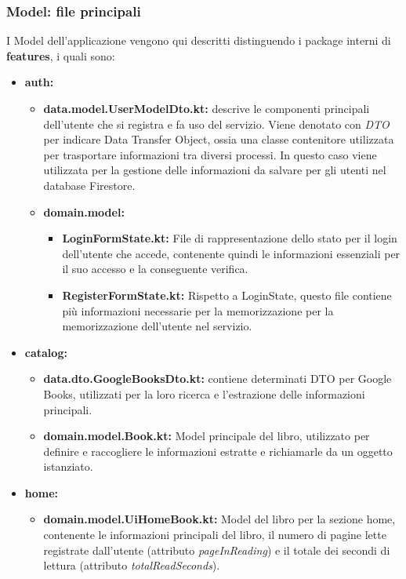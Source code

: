 \documentclass{article}
\begin{document}
\subsubsection{Model: file principali}
I Model dell'applicazione vengono qui descritti distinguendo i package interni di \textbf{features}, i quali sono:
\begin{itemize}
  \item \textbf{auth:}
  \begin{itemize}
    \item \textbf{data.model.UserModelDto.kt:} descrive le componenti principali dell'utente che si registra e fa uso del servizio.
    Viene denotato con \textit{DTO} per indicare Data Transfer Object, ossia una classe contenitore utilizzata per trasportare informazioni tra diversi processi.
    In questo caso viene utilizzata per la gestione delle informazioni da salvare per gli utenti nel database Firestore.
    \item \textbf{domain.model:}
    \begin{itemize}
      \item \textbf{LoginFormState.kt:} File di rappresentazione dello stato per il login dell'utente che accede, contenente quindi le informazioni essenziali per il suo accesso e la conseguente verifica.
      \item \textbf{RegisterFormState.kt:} Rispetto a LoginState, questo file contiene più informazioni necessarie per la memorizzazione per la memorizzazione dell'utente nel servizio.
    \end{itemize}
  \end{itemize}
  \item \textbf{catalog:}
  \begin{itemize}
    \item \textbf{data.dto.GoogleBooksDto.kt:} contiene determinati DTO per Google Books, utilizzati per la loro ricerca e l'estrazione delle informazioni principali.
    \item \textbf{domain.model.Book.kt:} Model principale del libro, utilizzato per definire e raccogliere le informazioni estratte e richiamarle da un oggetto istanziato.
  \end{itemize}
  \item \textbf{home:}
  \begin{itemize}
    \item \textbf{domain.model.UiHomeBook.kt:} Model del libro per la sezione home, contenente le informazioni principali del libro, il numero di pagine lette registrate dall'utente (attributo \textit{pageInReading}) e il totale dei secondi di lettura (attributo \textit{totalReadSeconds}).

\end{itemize}
\end{itemize}
\end{document}
